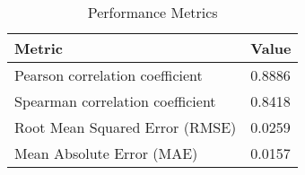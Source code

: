 \documentclass{article}
\begin{document}
\begin{table}[h!]
\centering
\begin{tabular}{ll}
\toprule
Metric & Value \\
\midrule
Pearson correlation coefficient & 0.8886 \\
Spearman correlation coefficient & 0.8418 \\
Root Mean Squared Error (RMSE) & 0.0259 \\
Mean Absolute Error (MAE) & 0.0157 \\
\bottomrule
\end{tabular}
\caption{Performance Metrics}
\label{tab:metrics}
\end{table}
\end{document}
